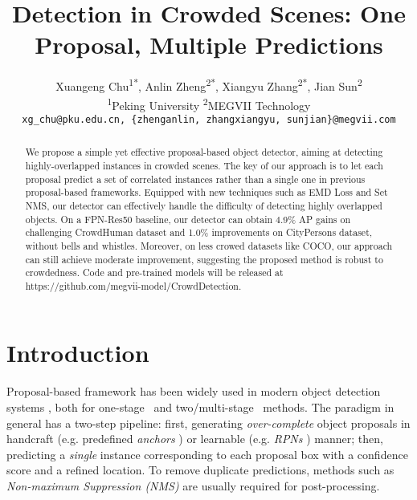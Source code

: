 \documentclass[10pt,twocolumn,letterpaper]{article}
\author{\Large 
Xuangeng Chu\textsuperscript{\rm 1*},
Anlin Zheng\textsuperscript{\rm 2*},
Xiangyu Zhang\textsuperscript{\rm 2*\dag},
Jian Sun\textsuperscript{\rm 2}\\
\textsuperscript{\rm 1}Peking University\quad
\textsuperscript{\rm 2}MEGVII Technology\\
\texttt{\small xg\_chu@pku.edu.cn, \{zhenganlin, zhangxiangyu, sunjian\}@megvii.com}\\
}
\begin{document}
\title{Detection in Crowded Scenes: One Proposal, Multiple Predictions}
\maketitle

{\let\thefootnote\relax{}}
{\let\thefootnote\relax{}}
{\let\thefootnote\relax{}}

\begin{abstract}
   We propose a simple yet effective proposal-based object detector, aiming at detecting highly-overlapped instances in crowded scenes. The key of our approach is to let each proposal predict a set of correlated instances rather than a single one in previous proposal-based frameworks. Equipped with new techniques such as EMD Loss and Set NMS, our detector can effectively handle the difficulty of detecting highly overlapped objects. On a FPN-Res50 baseline, our detector can obtain 4.9\% AP gains on challenging CrowdHuman dataset and 1.0\%  improvements on CityPersons dataset, without bells and whistles. Moreover, on less crowed datasets like COCO, our approach can still achieve moderate improvement, suggesting the proposed method is robust to crowdedness.
   Code and pre-trained models will be released at https://github.com/megvii-model/CrowdDetection.
\end{abstract}


\section{Introduction}
\label{sec:intro}
Proposal-based framework has been widely used in modern object detection systems \cite{ren2015faster,girshick2015fast,girshick2014rich,lin2017feature,lin2017focal,liu2016ssd,he2014spatial,dai2016rfcn,dai2017deformable,cai2019cascadercnn,he2017mask,yolov3,sniper2018,snip_object}, both for one-stage~\cite{liu2016ssd,yolov3,lin2017focal,dssd} and two/multi-stage~\cite{ren2015faster,lin2017feature,dai2016rfcn,dai2017deformable,he2017mask,cai2019cascadercnn} methods. The paradigm in general has a two-step pipeline: first, generating \emph{over-complete} object proposals in handcraft (e.g. predefined \emph{anchors} \cite{yolov3,liu2016ssd,lin2017focal}) or learnable (e.g. \emph{RPNs} \cite{ren2015faster,lin2017feature,he2017mask}) manner; then, predicting a \emph{single} instance corresponding to each proposal box with a confidence score and a refined location. To remove duplicate predictions, methods such as \emph{Non-maximum Suppression (NMS)} are usually required for post-processing. 
\end{document}
